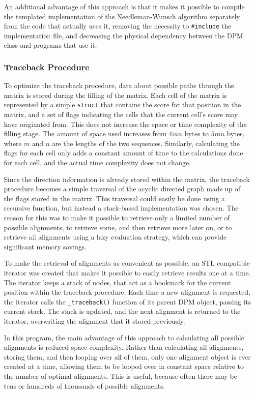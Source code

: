 \documentclass[a4paper]{report}
\begin{document}
An additional advantage of this approach is that it makes it possible to compile
the templated implementation of the Needleman-Wunsch algorithm separately from the
code that actually uses it, removing the necessity to \verb=#include= the
implementation file, and decreasing the physical dependency between the DPM class and
programs that use it.

\subsubsection*{Traceback Procedure}

To optimize the traceback procedure, data about possible paths through
the matrix is stored during the filling of the matrix. Each cell of the matrix
is represented by a simple \verb=struct= that contains the score for that position
in the matrix, and a set of flags indicating the cells that the current cell's
score may have originated from. This does not increase the space or time
complexity of the filling stage. The amount of space used increases from
$4mn$ bytes to $5mn$ bytes, where $m$ and $n$ are the lengths of the
two sequences. Similarly, calculating the flags for each cell only adds a
constant amount of time to the calculations done for each cell, and the actual
time complexity does not change.

Since the direction information is already stored within the matrix, the
traceback procedure becomes a simple traversal of the acyclic directed
graph made up of the flags stored in the matrix. This traversal could easily
be done using a recursive function, but instead a stack-based implementation
was chosen. The reason for this was to make it possible to retrieve only a
limited number of possible alignments, to retrieve some, and then retrieve
more later on, or to retrieve all alignments using a lazy evaluation strategy,
which can provide significant memory savings.

To make the retrieval of alignments as convenient as possible, an STL compatible
iterator was created that makes it possible to easily retrieve results one at a
time. The iterator keeps a stack of nodes, that act as a bookmark for the current
position within the traceback procedure. Each time a new alignment is requested,
the iterator calls the \verb=_traceback()= function of its parent DPM object, passing its
current stack. The stack is updated, and the next alignment is returned to the
iterator, overwriting the alignment that it stored previously.

In this program, the main advantage of this approach to calculating all
possible alignments is reduced space complexity. Rather than calculating all
alignments, storing them, and then looping over all of them, only one alignment
object is ever created at a time, allowing them to be looped over in constant
space relative to the number of optimal alignments. This is useful, because often
there may be tens or hundreds of thousands of possible alignments.
\end{document}
